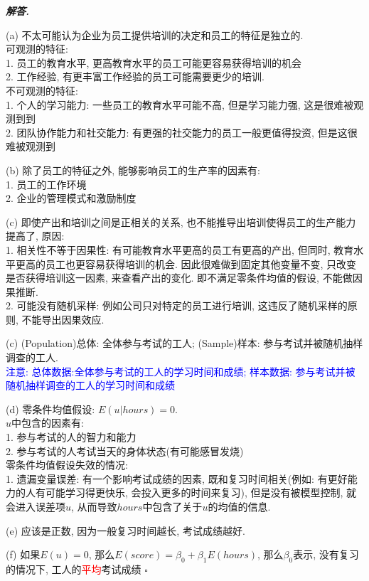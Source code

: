 \documentclass[10pt, a4paper, oneside]{ctexart}
\newenvironment{solution}{%
  \par\noindent\textbf{\textit{解答. }}\ignorespaces
}{%
  \hfill\ensuremath{\square}\par %
}
\begin{document}
\begin{solution}
(a) 不太可能认为企业为员工提供培训的决定和员工的特征是独立的.\\
可观测的特征:\\
1. 员工的教育水平, 更高教育水平的员工可能更容易获得培训的机会\\
2. 工作经验, 有更丰富工作经验的员工可能需要更少的培训.\\
不可观测的特征:\\
1. 个人的学习能力: 一些员工的教育水平可能不高, 但是学习能力强, 这是很难被观测到到\\
2. 团队协作能力和社交能力: 有更强的社交能力的员工一般更值得投资, 但是这很难被观测到

(b) 除了员工的特征之外, 能够影响员工的生产率的因素有:\\
1. 员工的工作环境\\
2. 企业的管理模式和激励制度

(c) 即使产出和培训之间是正相关的关系, 也不能推导出培训使得员工的生产能力提高了, 原因:\\
1. 相关性不等于因果性: 有可能教育水平更高的员工有更高的产出, 但同时, 教育水平更高的员工也更容易获得培训的机会. 因此很难做到固定其他变量不变, 只改变是否获得培训这一因素, 来查看产出的变化. 即不满足零条件均值的假设, 不能做因果推断.\\
2. 可能没有随机采样: 例如公司只对特定的员工进行培训, 这违反了随机采样的原则, 不能导出因果效应.

(c) (Population)总体: 全体参与考试的工人; (Sample)样本: 参与考试并被随机抽样调查的工人.\\
\textcolor{blue}{注意: 总体数据:全体参与考试的工人的学习时间和成绩; 样本数据: 参与考试并被随机抽样调查的工人的学习时间和成绩}

(d) 零条件均值假设: $E(u|hours)=0$.\\
$u$中包含的因素有:\\
1. 参与考试的人的智力和能力\\
2. 参与考试的人考试当天的身体状态(有可能感冒发烧)\\
零条件均值假设失效的情况:\\
1. 遗漏变量误差: 有一个影响考试成绩的因素, 既和复习时间相关(例如: 有更好能力的人有可能学习得更快乐, 会投入更多的时间来复习), 但是没有被模型控制, 就会进入误差项$u$, 从而导致$hours$中包含了关于$u$的均值的信息.

(e) 应该是正数, 因为一般复习时间越长, 考试成绩越好.

(f) 如果$E(u)=0$, 那么$E(score) = \beta_0 + \beta_1 E(hours)$, 那么$\beta_0$表示, 没有复习的情况下, 工人的\textcolor{red}{平均}考试成绩
\end{solution}
\end{document}
